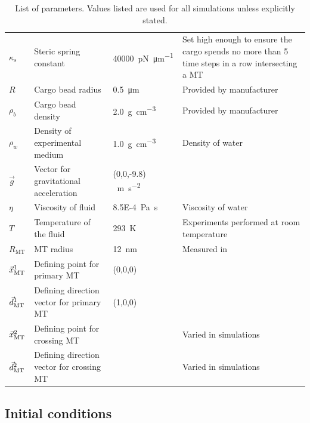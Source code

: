 \begin{table}
\begin{tabular}{p{.1\linewidth} p{.28\linewidth} p{.15\linewidth} p{.3\linewidth}}
$\kappa_s$ & Steric spring constant & \SI{40000}{\pico\newton\per\micro\meter} & Set high enough to ensure the cargo spends no more than 5 time steps in a row intersecting a MT \\

$R$ & Cargo bead radius & \SI{.5}{\micro\meter} & Provided by manufacturer \\

$\rho_b$ & Cargo bead density & \SI{2.0}{\gram\per\centi\meter^3} & Provided by manufacturer\\

$\rho_w$ & Density of experimental medium & \SI{1.0}{\gram\per\centi\meter^3} & Density of water \\

$\vec{g}$ & Vector for gravitational acceleration & (0,0,-9.8) \SI{}{\meter\per\second^2} & \\

$\eta$ & Viscosity of fluid & \SI{8.5E-4}{\pascal\second} & Viscosity of water \\

$T$ & Temperature of the fluid & \SI{293}{\kelvin} & Experiments performed at room temperature \\ \hline

$R_\text{MT}$ & MT radius & \SI{12}{\nano\meter} & Measured in \cite{Grimstone1966} \\

$\vec{x}_\text{MT}^1$ & Defining point for primary MT & (0,0,0) & \\

$\vec{d}_\text{MT}^1$ & Defining direction vector for primary MT & (1,0,0) & \\

$\vec{x}_\text{MT}^2$ & Defining point for crossing MT &  & Varied in simulations \\

$\vec{d}_\text{MT}^2$ & Defining direction vector for crossing MT &  & Varied in simulations \\

\end{tabular}
\caption[List of parameter values used]{List of parameters. Values listed are used for all simulations unless explicitly stated.} \label{tab:params}
\end{table}

\subsection{Initial conditions}

